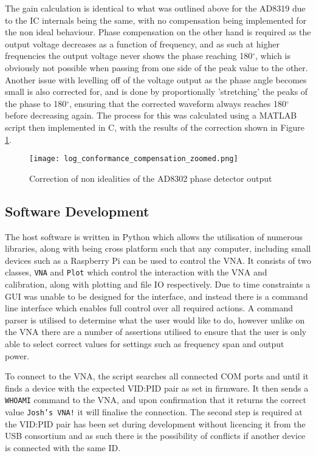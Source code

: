 The gain calculation is identical to what was outlined above for the AD8319 due to the IC internals being the same, with no compensation being implemented for the non ideal behaviour. Phase compensation on the other hand is required as the output voltage decreases as a function of frequency, and as such at higher frequencies the output voltage never shows the phase reaching 180$^\circ$, which is obviously not possible when passing from one side of the peak value to the other. Another issue with levelling off of the voltage output as the phase angle becomes small is also corrected for, and is done by proportionally 'stretching' the peaks of the phase to 180$^\circ$, ensuring that the corrected waveform always reaches 180$^\circ$ before decreasing again. The process for this was calculated using a MATLAB script then implemented in C, with the results of the correction shown in Figure \ref{fig:phase_comp}.

\begin{figure}[H]
	\centering
	\texttt{[image: log\_conformance\_compensation\_zoomed.png]}
	\caption{Correction of non idealities of the AD8302 phase detector output}
	\label{fig:phase_comp}
\end{figure}

\subsection{Software Development}
The host software is written in Python which allows the utilisation of numerous libraries, along with being cross platform such that any computer, including small devices such as a Raspberry Pi can be used to control the VNA. It consists of two classes, \texttt{VNA} and \texttt{Plot} which control the interaction with the VNA and calibration, along with plotting and file IO respectively. Due to time constraints a GUI was unable to be designed for the interface, and instead there is a command line interface which enables full control over all required actions. A command parser is utilised to determine what the user would like to do, however unlike on the VNA there are a number of assertions utilised to ensure that the user is only able to select correct values for settings such as frequency span and output power. 

To connect to the VNA, the script searches all connected COM ports and until it finds a device with the expected VID:PID pair as set in firmware. It then sends a \texttt{WHOAMI} command to the VNA, and upon confirmation that it returns the correct value \texttt{Josh's VNA!} it will finalise the connection. The second step is required at the VID:PID pair has been set during development without licencing it from the USB consortium and as such there is the possibility of conflicts if another device is connected with the same ID. 

